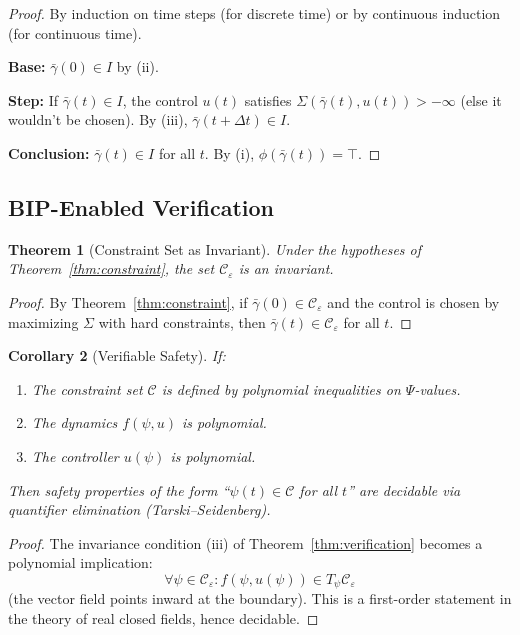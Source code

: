 \documentclass[11pt]{article}
\newtheorem{theorem}{Theorem}[section]
\newtheorem{corollary}[theorem]{Corollary}
\begin{document}
\begin{proof}
By induction on time steps (for discrete time) or by continuous induction (for continuous
time).

\textbf{Base:} $\bar{\gamma}(0) \in I$ by (ii).

\textbf{Step:} If $\bar{\gamma}(t) \in I$, the control $u(t)$ satisfies $\Sigma(\bar{\gamma}(t), u(t)) > -\infty$ (else it wouldn't be chosen).
By (iii), $\bar{\gamma}(t + \Delta t) \in I$.

\textbf{Conclusion:} $\bar{\gamma}(t) \in I$ for all $t$. By (i), $\phi(\bar{\gamma}(t)) = \top$.
\end{proof}

\subsection{BIP-Enabled Verification}

\begin{theorem}[Constraint Set as Invariant]
Under the hypotheses of Theorem~\ref{thm:constraint}, the set $\mathcal{C}_\varepsilon$
is an invariant.
\end{theorem}

\begin{proof}
By Theorem~\ref{thm:constraint}, if $\bar{\gamma}(0) \in \mathcal{C}_\varepsilon$ and the control is chosen by maximizing $\Sigma$ with hard
constraints, then $\bar{\gamma}(t) \in \mathcal{C}_\varepsilon$ for all $t$.
\end{proof}

\begin{corollary}[Verifiable Safety]
If:
\begin{enumerate}
    \item[(i)] The constraint set $\mathcal{C}$ is defined by polynomial inequalities on $\Psi$-values.
    \item[(ii)] The dynamics $f(\psi, u)$ is polynomial.
    \item[(iii)] The controller $u(\psi)$ is polynomial.
\end{enumerate}
Then safety properties of the form ``$\psi(t) \in \mathcal{C}$ for all $t$'' are decidable via quantifier elimination
(Tarski--Seidenberg).
\end{corollary}

\begin{proof}
The invariance condition (iii) of Theorem~\ref{thm:verification} becomes a polynomial implication:
\[
\forall \psi \in \mathcal{C}_\varepsilon : f(\psi, u(\psi)) \in T_\psi \mathcal{C}_\varepsilon
\]
(the vector field points inward at the boundary). This is a first-order statement in the theory
of real closed fields, hence decidable.
\end{proof}
\end{document}
